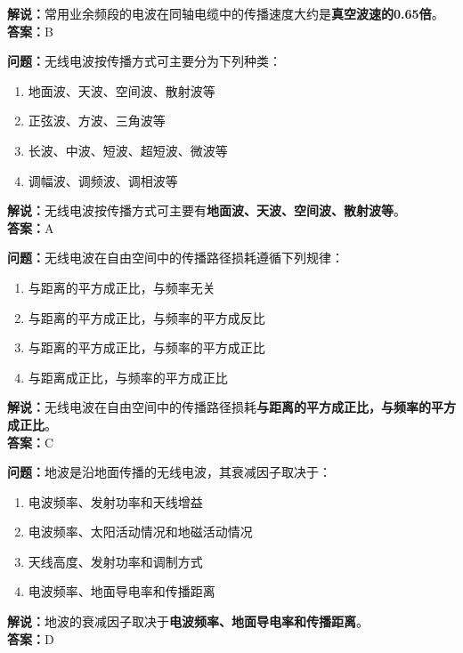 \textbf{解说：}常用业余频段的电波在同轴电缆中的传播速度大约是\textbf{真空波速的0.65倍}。\\\textbf{答案：}B



\textbf{问题：}无线电波按传播方式可主要分为下列种类：

\begin{enumerate}[label=\Alph*), leftmargin=1.5cm]
	\item 地面波、天波、空间波、散射波等
	\item 正弦波、方波、三角波等
	\item 长波、中波、短波、超短波、微波等
	\item 调幅波、调频波、调相波等
\end{enumerate}

\textbf{解说：}无线电波按传播方式可主要有\textbf{地面波、天波、空间波、散射波等}。\\\textbf{答案：}A



\textbf{问题：}无线电波在自由空间中的传播路径损耗遵循下列规律：

\begin{enumerate}[label=\Alph*), leftmargin=1.5cm]
	\item 与距离的平方成正比，与频率无关
	\item 与距离的平方成正比，与频率的平方成反比
	\item 与距离的平方成正比，与频率的平方成正比
	\item 与距离成正比，与频率的平方成正比
\end{enumerate}

\textbf{解说：}无线电波在自由空间中的传播路径损耗\textbf{与距离的平方成正比，与频率的平方成正比}。\\\textbf{答案：}C



\textbf{问题：}地波是沿地面传播的无线电波，其衰减因子取决于：

\begin{enumerate}[label=\Alph*), leftmargin=1.5cm]
	\item 电波频率、发射功率和天线增益
	\item 电波频率、太阳活动情况和地磁活动情况
	\item 天线高度、发射功率和调制方式
	\item 电波频率、地面导电率和传播距离
\end{enumerate}

\textbf{解说：}地波的衰减因子取决于\textbf{电波频率、地面导电率和传播距离}。\\\textbf{答案：}D


